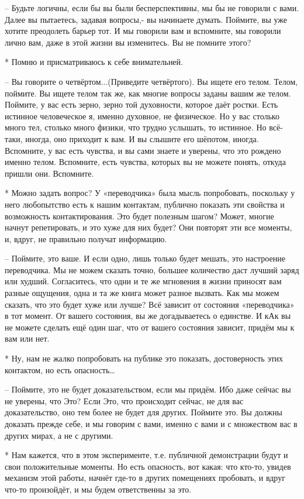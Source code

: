  – Будьте логичны, если бы вы были бесперспективны, мы бы не говорили с вами. Далее вы пытаетесь, задавая вопросы,-  вы начинаете думать. Поймите, вы уже хотите преодолеть барьер тот. И мы говорили вам и вспомните, мы говорили лично вам, даже в этой жизни вы изменитесь. Вы не помните этого?

 * Помню и присматриваюсь к себе внимательней.

 – Вы говорите о четвёртом...(Приведите четвёртого). Вы ищете его телом. Телом, поймите. Вы ищете телом так же, как многие вопросы заданы вашим же телом. Поймите, у вас есть зерно, зерно той духовности, которое даёт ростки. Есть истинное человеческое я, именно духовное, не физическое. Но у вас столько много тел, столько много физики, что трудно услышать, то истинное. Но всё-таки, иногда, оно приходит к вам. И вы слышите его шёпотом, иногда. Вспомните, у вас есть чувства, и вы сами знаете и уверены, что это рождено именно телом. Вспомните, есть чувства, которых вы не можете понять, откуда пришли они. Вспомните.

 * Можно задать вопрос? У «переводчика» была мысль попробовать, поскольку у него любопытство есть к нашим контактам, публично показать эти свойства и возможность контактирования. Это будет полезным шагом? Может, многие начнут репетировать, и это хуже для них будет? Они повторят эти все моменты, и, вдруг, не правильно получат информацию.

 – Поймите, это ваше. И если одно, лишь только будет мешать, это настроение переводчика. Мы не можем сказать точно, большее количество даст лучший заряд или худший. Согласитесь, что одни и те же мгновения в жизни приносят вам разные ощущения, одна и та же книга может разное вызвать. Как мы можем сказать, что это будет хуже или лучше? Всё зависит от состояния «переводчика» в тот момент. От вашего состояния, вы же догадываетесь о единстве. И кАк вы не можете сделать ещё один шаг, что от вашего состояния зависит, придём мы к вам или нет.

 * Ну, нам не жалко попробовать на публике это показать, достоверность этих контактом, но есть опасность…

 – Поймите, это не будет доказательством, если мы придём. Ибо даже сейчас вы не уверены, что Это? Если Это, что происходит сейчас, не для вас доказательство, оно тем более не будет для других. Поймите это. Вы должны доказать прежде себе, и мы говорим с вами, именно с вами и с множеством вас в других мирах, а не с другими.

 * Нам кажется, что в этом эксперименте, т.е. публичной демонстрации будут и свои положительные моменты. Но есть опасность, вот какая: что кто-то, увидев механизм этой работы, начнёт где-то в других помещениях пробовать, и вдруг что-то произойдёт, и мы будем ответственны за это.

